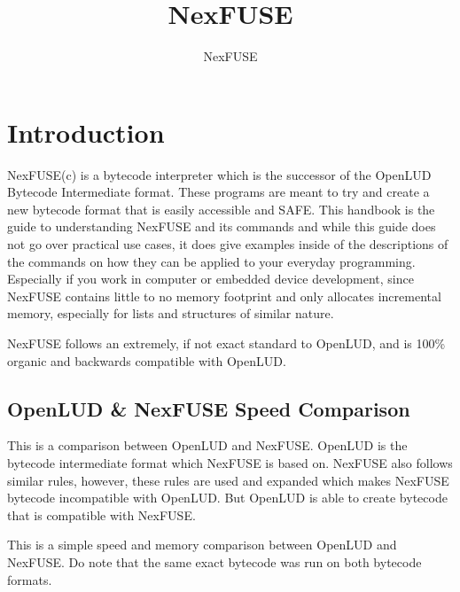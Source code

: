 \documentclass{article}
\title{NexFUSE}
\author{NexFUSE}
\begin{document}
\maketitle
\pagebreak
\tableofcontents
\pagebreak

\section{Introduction}

NexFUSE(c) is a bytecode interpreter which is the successor of the OpenLUD
Bytecode Intermediate format. These programs are meant to try and create a new
bytecode format that is easily accessible and SAFE. This handbook is the guide
to understanding NexFUSE and its commands and while this guide does not go over
practical use cases, it does give examples inside of the descriptions of the
commands on how they can be applied to your everyday programming. Especially if
you work in computer or embedded device development, since NexFUSE contains
little to no memory footprint and only allocates incremental memory, especially
for lists and structures of similar nature.

NexFUSE follows an extremely, if not exact standard to OpenLUD, and is 100\%
organic and backwards compatible with OpenLUD.

\subsection{OpenLUD \& NexFUSE Speed Comparison}

This is a comparison between OpenLUD and NexFUSE. OpenLUD is the bytecode
intermediate format which NexFUSE is based on. NexFUSE also follows similar
rules, however, these rules are used and expanded which makes NexFUSE bytecode
incompatible with OpenLUD. But OpenLUD is able to create bytecode that is
compatible with NexFUSE.

This is a simple speed and memory comparison between OpenLUD and NexFUSE. Do
note that the same exact bytecode was run on both bytecode formats.

\pagebreak
\end{document}
